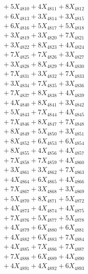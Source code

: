 \documentclass[a4paper,10pt]{article}
\begin{document}
{\begin{align}
&\;  + 5 X_{4810} + 4 X_{4811} + 8 X_{4812} \\[0.3ex]
&\;  + 6 X_{4813} + 3 X_{4814} + 3 X_{4815} \\[0.3ex]
&\;  + 6 X_{4816} + 5 X_{4817} + 5 X_{4818} \\[0.3ex]
&\;  + 3 X_{4819} + 3 X_{4820} + 7 X_{4821} \\[0.3ex]
&\;  + 3 X_{4822} + 8 X_{4823} + 4 X_{4824} \\[0.3ex]
&\;  + 7 X_{4825} + 7 X_{4826} + 3 X_{4827} \\[0.3ex]
&\;  + 3 X_{4828} + 8 X_{4829} + 4 X_{4830} \\[0.3ex]
&\;  + 7 X_{4831} + 3 X_{4832} + 7 X_{4833} \\[0.3ex]
&\;  + 3 X_{4834} + 7 X_{4835} + 3 X_{4836} \\[0.3ex]
&\;  + 7 X_{4837} + 8 X_{4838} + 4 X_{4839} \\[0.5ex]\allowbreak
&\;  + 4 X_{4840} + 8 X_{4841} + 3 X_{4842} \\[0.3ex]
&\;  + 5 X_{4843} + 7 X_{4844} + 4 X_{4845} \\[0.3ex]
&\;  + 7 X_{4846} + 8 X_{4847} + 7 X_{4848} \\[0.3ex]
&\;  + 8 X_{4849} + 5 X_{4850} + 3 X_{4851} \\[0.3ex]
&\;  + 8 X_{4852} + 6 X_{4853} + 6 X_{4854} \\[0.3ex]
&\;  + 8 X_{4855} + 4 X_{4856} + 4 X_{4857} \\[0.3ex]
&\;  + 7 X_{4858} + 7 X_{4859} + 4 X_{4860} \\[0.3ex]
&\;  + 3 X_{4861} + 3 X_{4862} + 7 X_{4863} \\[0.3ex]
&\;  + 4 X_{4864} + 6 X_{4865} + 4 X_{4866} \\[0.3ex]
&\;  + 7 X_{4867} + 3 X_{4868} + 3 X_{4869} \\[0.5ex]\allowbreak
&\;  + 5 X_{4870} + 8 X_{4871} + 5 X_{4872} \\[0.3ex]
&\;  + 4 X_{4873} + 4 X_{4874} + 4 X_{4875} \\[0.3ex]
&\;  + 7 X_{4876} + 5 X_{4877} + 5 X_{4878} \\[0.3ex]
&\;  + 4 X_{4879} + 6 X_{4880} + 6 X_{4881} \\[0.3ex]
&\;  + 4 X_{4882} + 6 X_{4883} + 7 X_{4884} \\[0.3ex]
&\;  + 4 X_{4885} + 7 X_{4886} + 7 X_{4887} \\[0.3ex]
&\;  + 7 X_{4888} + 6 X_{4889} + 4 X_{4890} \\[0.3ex]
&\;  + 4 X_{4891} + 4 X_{4892} + 6 X_{4893} \\[0.3ex]

\end{align}}
\end{document}
